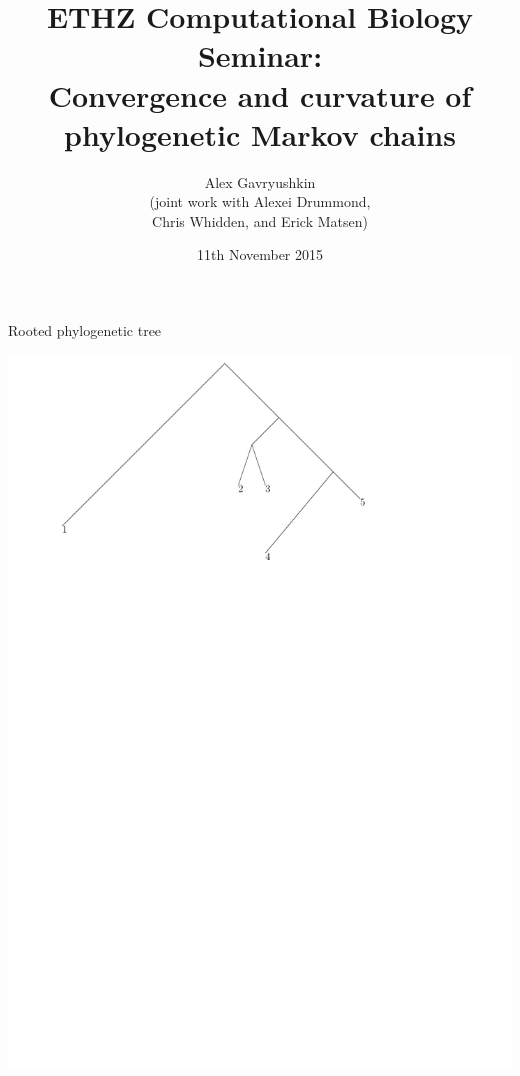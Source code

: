 \documentclass{beamer}
\title[\url{http://gavruskin.github.io/talks/ETHZ_2015.pdf}]{ETHZ Computational Biology Seminar:\\
Convergence and curvature of phylogenetic Markov chains}
\author[These slides:]{Alex Gavryushkin\\
(joint work with Alexei Drummond,\\
Chris Whidden, and Erick Matsen)}
\date{11th November 2015}
\theoremstyle{example}
\begin{document}
\begin{frame}[plain]
\titlepage
\end{frame}

\begin{frame}{Rooted phylogenetic tree}
\begin{definition}
\includegraphics[width=\framewidth]{rooted}
\end{definition}
\end{frame}
\end{document}
